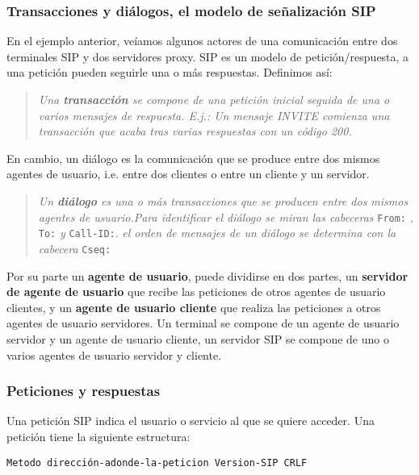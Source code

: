 \subsubsection{Transacciones y diálogos, el modelo de señalización SIP}
\label{sec:trans-y-dial}

En el ejemplo anterior, veíamos algunos actores de una comunicación entre dos terminales SIP y dos servidores proxy. SIP es un modelo de petición/respuesta, a una petición pueden seguirle una o más respuestas. Definimos así:

\begin{quotation}
\emph{Una \textbf{transacción} se compone de una petición inicial seguida de una o varios mensajes de respuesta. E.j.: Un mensaje INVITE comienza una transacción que acaba tras varias respuestas con un código 200.}
\end{quotation}

En cambio, un diálogo es la comunicación que se produce entre dos mismos agentes de usuario, i.e. entre dos clientes o entre un cliente y un servidor. 

\begin{quotation}
\emph{Un \textbf{diálogo} es una o más transacciones que se producen entre dos mismos agentes de usuario.Para identificar el diálogo se miran las cabeceras} \verb|From:| \emph{,} \verb|To:| \emph{y } \verb|Call-ID:|. \emph{el orden de mensajes de un diálogo se determina con la cabecera} \verb|Cseq:|
\end{quotation}

\label{sec:agente-de-usuario}

Por su parte un \textbf{agente de usuario}, puede dividirse en dos partes, un \textbf{servidor de agente de usuario} que recibe las peticiones de otros agentes de usuario clientes, y un \textbf{agente de usuario cliente} que realiza las peticiones a otros agentes de usuario servidores. Un terminal se compone de un agente de usuario servidor y un agente de usuario cliente, un servidor SIP se compone de uno o varios agentes de usuario servidor y cliente.

\subsubsection{Peticiones y respuestas}
\label{sec:peticiones-sip}

Una petición SIP indica el usuario o servicio al que se quiere acceder. Una petición tiene la siguiente estructura:

\begin{verbatim}
Metodo dirección-adonde-la-peticion Version-SIP CRLF
\end{verbatim}

